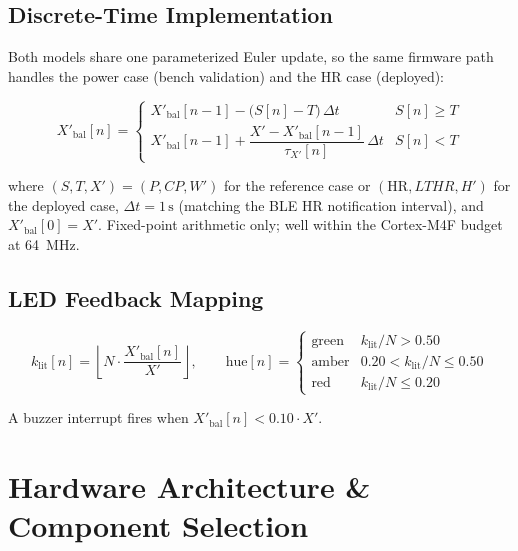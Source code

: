\documentclass[11pt, letterpaper]{article}
\begin{document}
\subsection{Discrete-Time Implementation}
\label{sec:discrete}

Both models share one parameterized Euler update, so the same firmware path handles the power
case (bench validation) and the HR case (deployed):

\begin{equation}
  X'_{\mathrm{bal}}[n] =
  \begin{cases}
    X'_{\mathrm{bal}}[n-1] - \bigl(S[n] - T\bigr)\,\Delta t & S[n] \geq T \\[8pt]
    X'_{\mathrm{bal}}[n-1] + \dfrac{X' - X'_{\mathrm{bal}}[n-1]}{\tau_{X'}[n]}\,\Delta t & S[n] < T
  \end{cases}
  \label{eq:discrete}
\end{equation}

where $(S, T, X') = (P, CP, W')$ for the reference case or $(\mathrm{HR}, LTHR, H')$ for the
deployed case, $\Delta t = 1\,\mathrm{s}$ (matching the BLE HR notification interval), and
$X'_{\mathrm{bal}}[0] = X'$. Fixed-point arithmetic only; well within the Cortex-M4F budget at
\SI{64}{\mega\hertz}.

\subsection{LED Feedback Mapping}

\begin{equation}
  k_{\mathrm{lit}}[n] = \left\lfloor N \cdot \frac{X'_{\mathrm{bal}}[n]}{X'} \right\rfloor,
  \qquad
  \mathrm{hue}[n] =
  \begin{cases}
    \text{green} & k_{\mathrm{lit}}/N > 0.50 \\
    \text{amber} & 0.20 < k_{\mathrm{lit}}/N \leq 0.50 \\
    \text{red}   & k_{\mathrm{lit}}/N \leq 0.20
  \end{cases}
\end{equation}

A buzzer interrupt fires when $X'_{\mathrm{bal}}[n] < 0.10 \cdot X'$.

\section{Hardware Architecture \& Component Selection}
\label{sec:hardware}
\end{document}
